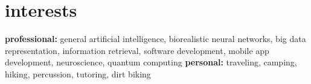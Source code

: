 \documentclass[]{friggeri-cv} %
\begin{document}

\section{interests}

\textbf{professional:} general artificial intelligence, biorealistic neural networks, big data representation, information retrieval, software development, mobile app development, neuroscience, quantum computing \textbf{personal:} traveling, camping, hiking, percussion, tutoring, dirt biking
\end{document}
